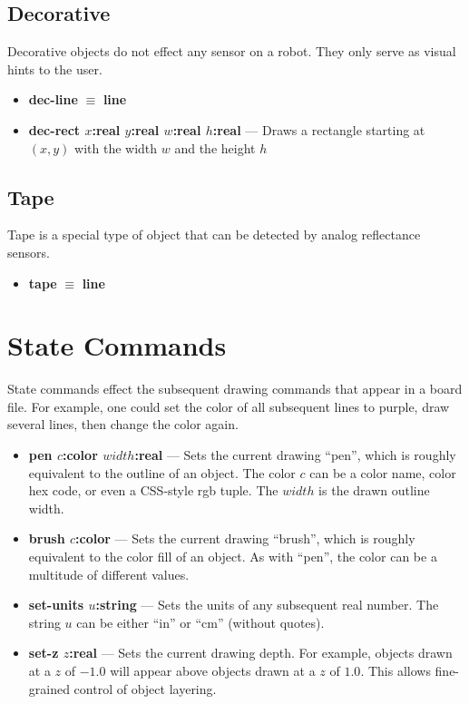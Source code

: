 \documentclass{article}
\begin{document}
  \subsection{Decorative}
  
  Decorative objects do not effect any sensor on a robot.
  They only serve as visual hints to the user.
  
  \begin{itemize}
    \item \textbf{dec-line} $\equiv$ \textbf{line}
    \item \textbf{dec-rect $x$:real $y$:real $w$:real $h$:real} --- Draws a rectangle starting at $(x, y)$ with the width $w$ and the height $h$
  \end{itemize}
  
  \subsection{Tape}
  
  Tape is a special type of object that can be detected by
  analog reflectance sensors.
  
  \begin{itemize}
    \item \textbf{tape} $ \equiv $ \textbf{line}
  \end{itemize}
  
  \section{State Commands}
  
  State commands effect the subsequent drawing commands that appear in a board file. For example, one could set the color of all subsequent lines to purple, draw several lines, then change the color again.
  
  \begin{itemize}
    \item \textbf{pen $c$:color $width$:real} --- Sets the current drawing ``pen'', which is roughly equivalent to the outline of an object. The color $c$ can be a color name, color hex code, or even a CSS-style rgb tuple. The $width$ is the drawn outline width.
    \item \textbf{brush $c$:color} --- Sets the current drawing ``brush'', which is roughly equivalent to the color fill of an object. As with ``pen'', the color can be a multitude of different values.
    \item \textbf{set-units $u$:string} --- Sets the units of any subsequent real number. The string $u$ can be either ``in'' or ``cm'' (without quotes).
    \item \textbf{set-z $z$:real} --- Sets the current drawing depth. For example, objects drawn at a $z$ of $-1.0$ will appear
    above objects drawn at a $z$ of $1.0$. This allows fine-grained control of object layering.
  \end{itemize}
  
  
\end{document}

